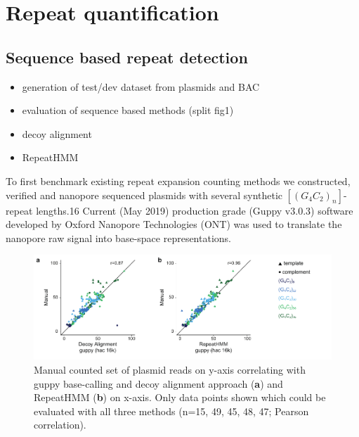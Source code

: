 \section{Repeat quantification}
\label{sec:strique:quantification}

\subsection{Sequence based repeat detection}
\label{subsec:strique:seq_repeat_counts}

\begin{itemize}
	\item generation of test/dev dataset from plasmids and BAC
	\item evaluation of sequence based methods (split fig1)
	\item decoy alignment
	\item RepeatHMM
\end{itemize}

To first benchmark existing repeat expansion counting methods we constructed, verified and nanopore sequenced plasmids with several synthetic $ [(G_{4}C_{2})_{n}] $-repeat lengths.16 Current (May 2019) production grade (Guppy v3.0.3) software developed by Oxford Nanopore Technologies (ONT) was used to translate the nanopore raw signal into base-space representations.

\begin{figure}[h]
    \centering
    \includegraphics[width=1.0\textwidth]{figures/strique/count_seq_manual.pdf}
    \captionsetup{format=plain}
    \caption[Correlation and strand bias in STR analysis methods]{Manual counted set of plasmid reads on y-axis correlating with guppy base-calling and decoy alignment approach (\textbf{a}) and RepeatHMM (\textbf{b}) on x-axis. Only data points shown which could be evaluated with all three methods (n=15, 49, 45, 48, 47; Pearson correlation).}
    \label{fig:strique:count_seq_manual}
\end{figure}

